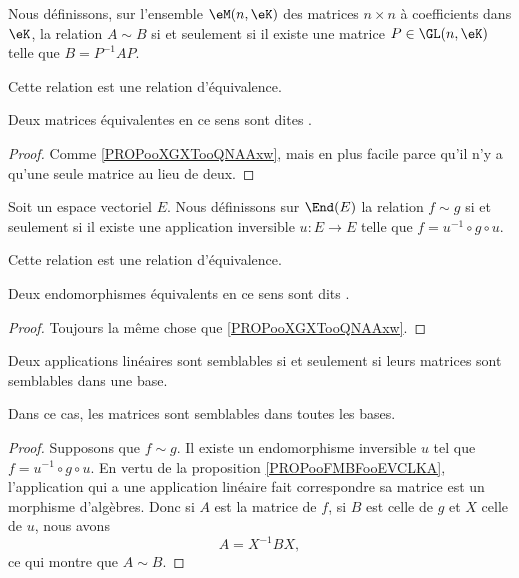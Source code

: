 \begin{propositionDef} \label{DefCQNFooSDhDpB}
	Nous définissons, sur l'ensemble \( \eM(n,\eK)\) des matrices \( n\times n\) à coefficients dans \(\eK\), la relation  \( A\sim B\) si et seulement si il existe une matrice \( P\in\GL(n,\eK)\) telle que \( B=P^{-1}AP\).

	Cette relation est une relation d'équivalence.

	Deux matrices équivalentes en ce sens sont dites .
\end{propositionDef}

\begin{proof}
	Comme \ref{PROPooXGXTooQNAAxw}, mais en plus facile parce qu'il n'y a qu'une seule matrice au lieu de deux.
\end{proof}

\begin{propositionDef}      \label{PROPooIXFSooZsFWHm}
	Soit un espace vectoriel \( E\). Nous définissons sur \( \End(E)\) la relation \( f\sim g\) si et seulement si il existe une application inversible \( u\colon E\to E\) telle que \( f=u^{-1}\circ g\circ u\).

	Cette relation est une relation d'équivalence.

	Deux endomorphismes équivalents en ce sens sont dits .
\end{propositionDef}

\begin{proof}
	Toujours la même chose que \ref{PROPooXGXTooQNAAxw}.
\end{proof}

\begin{proposition}     \label{PROPooBGJBooXlDYEv}
	Deux applications linéaires sont semblables si et seulement si leurs matrices sont semblables dans une base.

	Dans ce cas, les matrices sont semblables dans toutes les bases.
\end{proposition}

\begin{proof}
	Supposons que \( f\sim g\). Il existe un endomorphisme inversible \( u\) tel que \( f=u^{-1}\circ g\circ u\). En vertu de la proposition \ref{PROPooFMBFooEVCLKA}, l'application qui a une application linéaire fait correspondre sa matrice est un morphisme d'algèbres. Donc si \( A\) est la matrice de \( f\), si \( B\) est celle de \( g\) et \( X\) celle de \( u\), nous avons
	\begin{equation}
		A=X^{-1}BX,
	\end{equation}
	ce qui montre que \( A\sim B\).
\end{proof}

